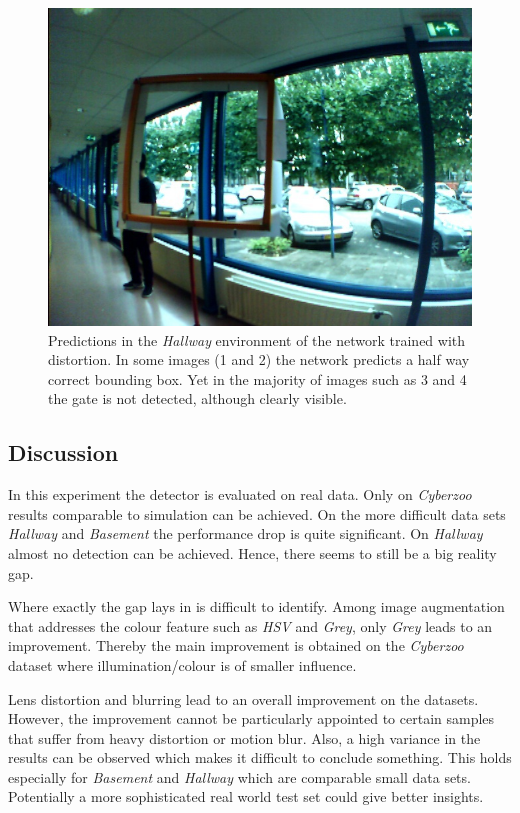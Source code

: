 \begin{figure}[hbtp]
\begin{minipage}{0.24\textwidth}
	\includegraphics[width=\textwidth]{fig/examples/hallway_notnice2.jpg}
\end{minipage}
\caption{Predictions in the \textit{Hallway} environment of the network trained with distortion. In some images (1 and 2) the network predicts a half way correct bounding box. Yet in the majority of images such as 3 and 4 the gate is not detected, although clearly visible. }
\label{fig:example_hallway}
\end{figure}

\subsection{Discussion}

In this experiment the detector is evaluated on real data. Only on \textit{Cyberzoo} results comparable to simulation can be achieved. On the more difficult data sets \textit{Hallway} and \textit{Basement} the performance drop is quite significant. On \textit{Hallway} almost no detection can be achieved. Hence, there seems to still be a big reality gap.

Where exactly the gap lays in is difficult to identify. Among image augmentation that addresses the colour feature such as \textit{HSV} and \textit{Grey}, only \textit{Grey} leads to an improvement. Thereby the main improvement is obtained on the \textit{Cyberzoo} dataset where illumination/colour is of smaller influence. 

Lens distortion and blurring lead to an overall improvement on the datasets. However, the improvement cannot be particularly appointed to certain samples that suffer from heavy distortion or motion blur. Also, a high variance in the results can be observed which makes it difficult to conclude something. This holds especially for \textit{Basement} and \textit{Hallway} which are comparable small data sets. Potentially a more sophisticated real world test set could give better insights.

